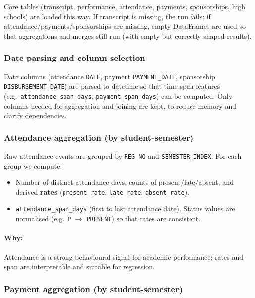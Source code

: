 \documentclass[12pt,a4paper]{article}
\begin{document}
Core tables (transcript, performance, attendance, payments, sponsorships, high schools) are loaded this way. If transcript is missing, the run fails; if attendance/payments/sponsorships are missing, empty DataFrames are used so that aggregations and merges still run (with empty but correctly shaped results).

\subsubsection{Date parsing and column selection}

Date columns (attendance \texttt{DATE}, payment \texttt{PAYMENT\_DATE}, sponsorship \texttt{DISBURSEMENT\_DATE}) are parsed to datetime so that time-span features (e.g.\ \texttt{attendance\_span\_days}, \texttt{payment\_span\_days}) can be computed. Only columns needed for aggregation and joining are kept, to reduce memory and clarify dependencies.

\subsubsection{Attendance aggregation (by student-semester)}

Raw attendance events are grouped by \texttt{REG\_NO} and \texttt{SEMESTER\_INDEX}. For each group we compute:

\begin{itemize}[leftmargin=*]
  \item Number of distinct attendance days, counts of present/late/absent, and derived \textbf{rates} (\texttt{present\_rate}, \texttt{late\_rate}, \texttt{absent\_rate}).
  \item \texttt{attendance\_span\_days} (first to last attendance date). Status values are normalised (e.g.\ \texttt{P} $\to$ \texttt{PRESENT}) so that rates are consistent.
\end{itemize}

\paragraph{Why:} Attendance is a strong behavioural signal for academic performance; rates and span are interpretable and suitable for regression.

\subsubsection{Payment aggregation (by student-semester)}
\end{document}
